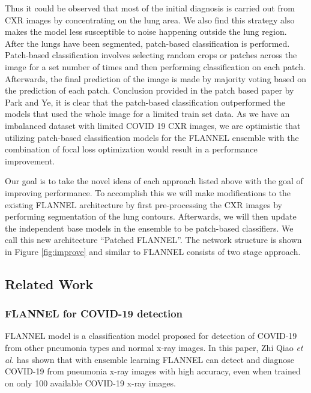 \documentclass{sigkddExp}
\begin{document}
Thus it could be observed that most of the initial diagnosis is carried out from
CXR images by concentrating on the lung area. We also find this strategy also
makes the model less susceptible to noise happening outside the lung region.
After the lungs have been segmented, patch-based classification is performed.
Patch-based classification involves selecting random crops or patches across the
image for a set number of times and then performing classification on each
patch. Afterwards, the final prediction of the image is made by majority voting
based on the prediction of each patch. Conclusion provided in the patch based
paper \cite{pmid32396075} by Park and Ye, it is clear that the patch-based
classification outperformed the models that used the whole image for a limited
train set data. As we have an imbalanced dataset with limited COVID 19 CXR
images, we are optimistic that utilizing patch-based classification models for
the FLANNEL ensemble with the combination of focal loss optimization would
result in a performance improvement.

Our goal is to take the novel ideas of each approach listed above with the goal
of improving performance. To accomplish this we will make modifications to the
existing FLANNEL architecture by first pre-processing the CXR images by
performing segmentation of the lung contours. Afterwards, we will then update
the independent base models in the ensemble to be patch-based classifiers. We
call this new architecture “Patched FLANNEL”. The network structure is shown in
Figure \ref{fig:improve} and similar to FLANNEL consists of two stage approach.

\subsection{Related Work}

\subsubsection{FLANNEL for COVID-19 detection}

FLANNEL model \cite{10.1093/jamia/ocaa280} is a classification model proposed
for detection of COVID-19 from other pneumonia types and normal x-ray images. In
this paper, Zhi Qiao \textit{et al.} has shown that with ensemble learning
FLANNEL can detect and diagnose COVID-19 from pneumonia x-ray images with high
accuracy, even when trained on only 100 available COVID-19 x-ray images.
\end{document}
